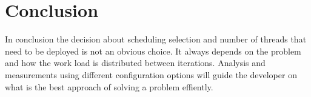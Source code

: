 \section{Conclusion}
In conclusion the decision about scheduling selection and number of threads that need to be deployed is not an obvious choice. It always depends on the problem and how the work load is distributed between iterations. Analysis and measurements using different configuration options will guide the developer on what is the best approach of solving a problem effiently.